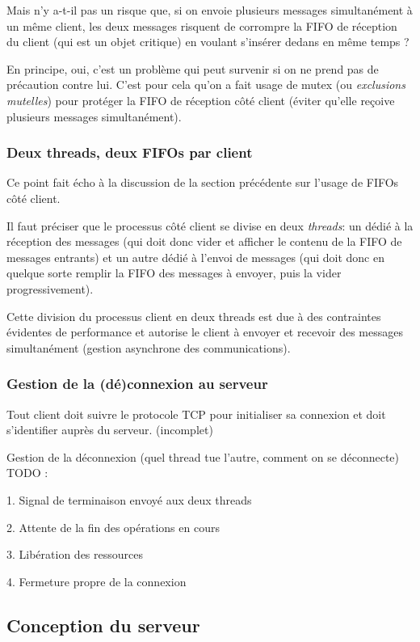 \documentclass{article}
\begin{document}
 \noindent Mais n'y a-t-il pas un risque que, si on envoie plusieurs messages simultanément à un même client, les deux messages risquent de corrompre la FIFO de réception du client (qui est un objet critique) en voulant s'insérer dedans en même temps ?


\noindent En principe, oui, c'est un problème qui peut survenir si on ne prend pas de précaution contre lui. C'est pour cela qu'on a fait usage de mutex (ou \textit{exclusions mutelles}) \cite{std::mutex} pour protéger la FIFO de réception côté client (éviter qu'elle reçoive plusieurs messages simultanément).


\subsubsection{Deux threads, deux FIFOs par client}
Ce point fait écho à la discussion de la section précédente sur l'usage de FIFOs côté client. 

\noindent Il faut préciser que le processus côté client se divise en deux \textit{threads}: un dédié à la réception des messages (qui doit donc vider et afficher le contenu de la FIFO de messages entrants) et un autre dédié à l'envoi de messages (qui doit donc en quelque sorte remplir la FIFO des messages à envoyer, puis la vider progressivement). 

\noindent Cette division du processus client en deux threads est due à des contraintes évidentes de performance et autorise le client à envoyer et recevoir des messages simultanément (gestion asynchrone des communications).

\subsubsection{Gestion de la (dé)connexion au serveur}
\noindent Tout client doit suivre le protocole TCP \cite{TCP-IP} pour initialiser sa connexion et doit s'identifier auprès du serveur.
(incomplet)


 Gestion de la déconnexion (quel thread tue l'autre, comment on se déconnecte) TODO :
 
1. Signal de terminaison envoyé aux deux threads

2. Attente de la fin des opérations en cours

3. Libération des ressources

4. Fermeture propre de la connexion

\subsection{Conception du serveur}
\end{document}
